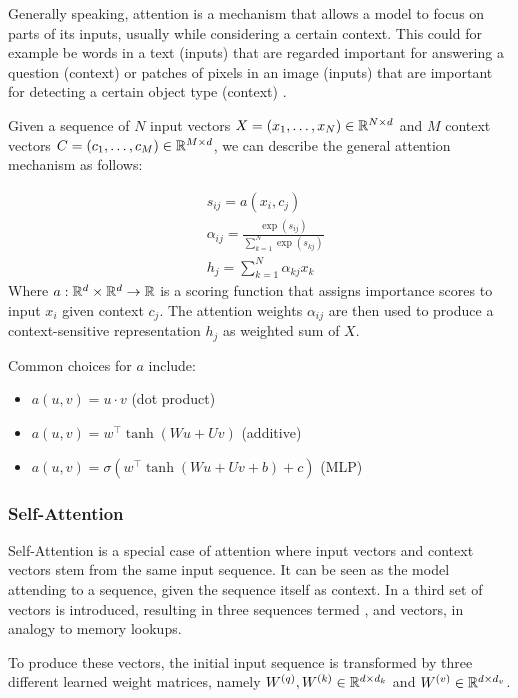 Generally speaking, attention is a mechanism that allows a model to focus on parts of its inputs, usually while considering a certain context. This could for example be words in a text (inputs) that are regarded important for answering a question (context) \cite{xiong2016dynamic} or patches of pixels in an image (inputs) that are important for detecting a certain object type (context) \cite{xu2015show}.

Given a sequence of $N$ input vectors $X = (x_1, \dots, x_N) \in \mathbb{R}^{N \times d}$ and $M$ context vectors $C = (c_1, \dots, c_M) \in \mathbb{R}^{M \times d}$, we can describe the general attention mechanism as follows:

\begin{align}
     & s_{ij} = a(x_i, c_j)                                         \\
     & \alpha_{ij} = \frac{\exp(s_{ij})}{\sum_{k=1}^N \exp(s_{kj})} \\
     & h_j = \sum_{k=1}^N \alpha_{kj} x_k
\end{align}
Where $a: \mathbb{R}^d \times \mathbb{R}^d \rightarrow \mathbb{R}$ is a scoring function that assigns importance scores to input $x_i$ given context $c_j$. The attention weights $\alpha_{ij}$ are then used to produce a context-sensitive representation $h_j$ as weighted sum of $X$.

Common choices for $a$ include:
\begin{itemize}
    \item $a(u, v) = u \cdot v$ (dot product)
    \item $a(u, v) = w^\top \tanh(W u + U v)$ (additive)
    \item $a(u, v) = \sigma(w^\top \tanh(W u + U v + b) + c)$ (MLP)
\end{itemize}

\subsubsection{Self-Attention}
Self-Attention is a special case of attention where input vectors and context vectors stem from the same input sequence. It can be seen as the model attending to a sequence, given the sequence itself as context. In \cite{vaswani2017attention} a third set of  vectors is introduced, resulting in three sequences termed ,  and  vectors, in analogy to memory lookups.

To produce these vectors, the initial input sequence is transformed by three different learned weight matrices, namely $W^{(q)}, W^{(k)} \in \mathbb{R}^{d \times d_k}$ and $W^{(v)} \in \mathbb{R}^{d \times d_v}$.

